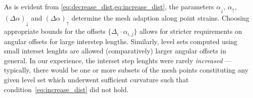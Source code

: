

As is evident from \cref{eq:decrease_dist,eq:increase_dist}, the parameters
$\alpha_{\downarrow}$, $\alpha_{\uparrow}$, $(\Delta\alpha)_{\downarrow}$ and
$(\Delta\alpha)_{\uparrow}$ determine the mesh adaption along point strains.
Choosing appropriate bounds for the offsets $\{\Delta_{i}\cdot\alpha_{i,j}\}$
allows for stricter requirements on angular offsets for large interstep lengths.
Similarly, level sets computed using small interset lenghts are allowed
(comparatively) larger angular offsets in general. In our experience, the
interset step lenghts were rarely \emph{increased}  --- typically, there would
be one or more subsets of the mesh points constituting any given level set which
underwent sufficient curvature such that condition~\eqref{eq:increase_dist} did
not hold.
